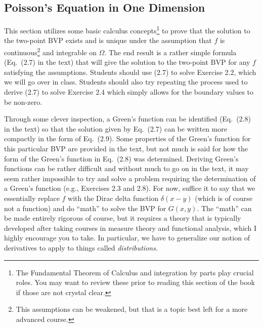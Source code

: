 \documentclass{amsart}
\theoremstyle{plain}
\theoremstyle{definition}
\theoremstyle{remark}
\theoremstyle{definition}
\numberwithin{equation}{section}
\numberwithin{equation}{section}
\begin{document}
\subsection{Poisson's Equation in One Dimension}

This section utilizes some basic calculus concepts\footnote{The Fundamental Theorem of Calculus and integration by parts play crucial roles. You may want to review these prior to reading this section of the book if those are not crystal clear.} to prove that the solution to the two-point BVP exists and is unique under the assumption that $f$ is continuous\footnote{This assumptions can be weakened, but that is a topic best left for a more advanced course.} and integrable on $\Omega$.
The end result is a rather simple formula (Eq.~(2.7) in the text) that will give the solution to the two-point BVP for any $f$ satisfying the assumptions.
Students should use (2.7) to solve Exercise 2.2, which we will go over in class. 
Students should also try repeating the process used to derive (2.7) to solve Exercise 2.4 which simply allows for the boundary values to be non-zero. 

Through some clever inspection, a Green's function can be identified (Eq.~(2.8) in the text) so that the solution given by Eq.~(2.7) can be written more compactly in the form of Eq.~(2.9).   
Some properties of the Green's function for this particular BVP are provided in the text, but not much is said for how the form of the Green's function in Eq.~(2.8) was determined.
Deriving Green's functions can be rather difficult and without much to go on in the text, it may seem rather impossible to try and solve a problem requiring the determination of a Green's function (e.g., Exercises 2.3 and 2.8).
For now, suffice it to say that we essentially replace $f$ with the Dirac delta function $\delta(x-y)$ (which is of course not a function) and do ``math'' to solve the BVP for $G(x,y)$. 
The ``math'' can be made entirely rigorous of course, but it requires a theory that is typically developed after taking courses in measure theory and functional analysis, which I highly encourage you to take.
In particular, we have to generalize our notion of derivatives to apply to things called {\em distributions}. 
\end{document}
